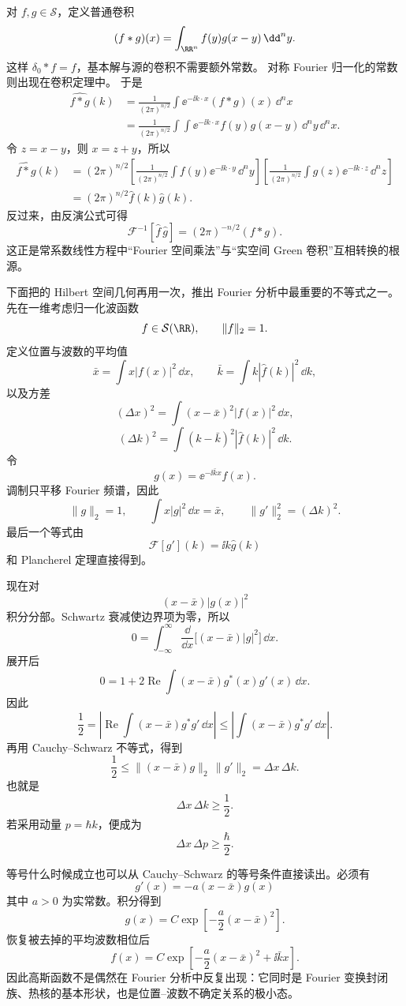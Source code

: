 对 $f,g\in\mathcal S$，定义普通卷积
\[
(f*g)(x)
=\int_{\RR^n}f(y)g(x-y)\,\dd^n y.
\]
这样 $\delta_0*f=f$，基本解与源的卷积不需要额外常数。
对称 Fourier 归一化的常数则出现在卷积定理中。
于是
\[
\begin{aligned}
\widehat{f*g}(k)
&=\frac1{(2\pi)^{n/2}}
 \int \ee^{-\ii k\cdot x}(f*g)(x)\,\dd^n x\\
&=\frac1{(2\pi)^{n/2}}
 \int\!\int \ee^{-\ii k\cdot x}f(y)g(x-y)
 \,\dd^n y\,\dd^n x.
\end{aligned}
\]
令 $z=x-y$，则 $x=z+y$，所以
\[
\begin{aligned}
\widehat{f*g}(k)
&=(2\pi)^{n/2}\left[
\frac1{(2\pi)^{n/2}}
\int f(y)\ee^{-\ii k\cdot y}\,\dd^n y
\right]
\left[
\frac1{(2\pi)^{n/2}}
\int g(z)\ee^{-\ii k\cdot z}\,\dd^n z
\right]\\
&=(2\pi)^{n/2}\widehat f(k)\widehat g(k).
\end{aligned}
\]
反过来，由反演公式可得
\[
\mathcal F^{-1}[\widehat f\,\widehat g]=(2\pi)^{-n/2}(f*g).
\]
这正是常系数线性方程中``Fourier 空间乘法''与``实空间 Green 卷积''互相转换的根源。

下面把的 Hilbert 空间几何再用一次，推出 Fourier 分析中最重要的不等式之一。先在一维考虑归一化波函数
\[
f\in\mathcal S(\RR),
\qquad \|f\|_2=1.
\]
定义位置与波数的平均值
\[
\bar x=\int x|f(x)|^2\,\dd x,
\qquad
\bar k=\int k|\widehat f(k)|^2\,\dd k,
\]
以及方差
\[
(\Delta x)^2
=\int (x-\bar x)^2|f(x)|^2\,\dd x,
\]
\[
(\Delta k)^2
=\int (k-\bar k)^2|\widehat f(k)|^2\,\dd k.
\]
令
\[
g(x)=\ee^{-\ii\bar k x}f(x).
\]
调制只平移 Fourier 频谱，因此
\[
\|g\|_2=1,
\qquad
\int x|g|^2\,\dd x=\bar x,
\qquad
\|g'\|_2^2=(\Delta k)^2.
\]
最后一个等式由
\[
\mathcal F[g'](k)=\ii k\widehat g(k)
\]
和 Plancherel 定理直接得到。

现在对
\[
(x-\bar x)|g(x)|^2
\]
积分分部。Schwartz 衰减使边界项为零，所以
\[
0
=\int_{-\infty}^{\infty}
\frac{\dd}{\dd x}\big[(x-\bar x)|g|^2\big] \,\dd x.
\]
展开后
\[
0
=1+2\operatorname{Re}
\int (x-\bar x)g^*(x)g'(x)\,\dd x.
\]
因此
\[
\frac12
=\left|
\operatorname{Re}
\int (x-\bar x)g^*g'\,\dd x
\right|
\le
\left|
\int (x-\bar x)g^*g'\,\dd x
\right|.
\]
再用 Cauchy--Schwarz 不等式，得到
\[
\frac12
\le
\|(x-\bar x)g\|_2\,\|g'\|_2
=\Delta x\,\Delta k.
\]
也就是
\begin{equation*}{\Delta x\,\Delta k\ge\frac12.}\end{equation*}
若采用动量 $p=\hbar k$，便成为
\[
\Delta x\,\Delta p\ge\frac\hbar2.
\]

等号什么时候成立也可以从 Cauchy--Schwarz 的等号条件直接读出。必须有
\[
g'(x)=-a(x-\bar x)g(x)
\]
其中 $a>0$ 为实常数。积分得到
\[
g(x)=C\exp\!\left[-\frac a2(x-\bar x)^2\right].
\]
恢复被去掉的平均波数相位后
\[
f(x)=C
\exp\!\left[-\frac a2(x-\bar x)^2+\ii\bar k x\right].
\]
因此高斯函数不是偶然在 Fourier 分析中反复出现：它同时是 Fourier 变换封闭族、热核的基本形状，也是位置--波数不确定关系的极小态。

